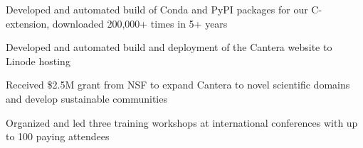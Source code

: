 \begin{tightemize}
\item Developed and automated build of Conda and PyPI packages for our C-extension, downloaded 200,000+ times in 5+ years
\item Developed and automated build and deployment of the Cantera website to Linode hosting
\item Received \$2.5M grant from NSF to expand Cantera to novel scientific domains and develop sustainable communities
\item Organized and led three training workshops at international conferences with up to 100 paying attendees
\end{tightemize}
\sectionsep

\\
\\

